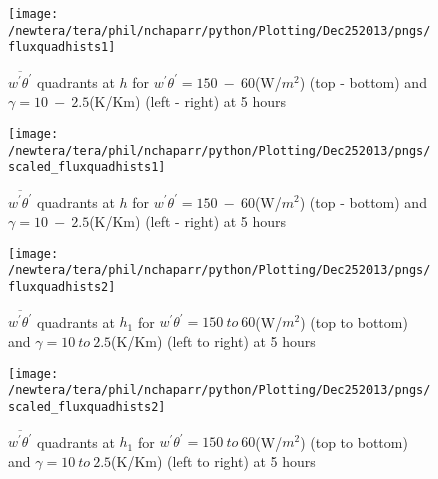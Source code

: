 \begin{figure}[htbp]
%
\centering
 \texttt{[image: /newtera/tera/phil/nchaparr/python/Plotting/Dec252013/pngs/fluxquadhists1]}                 

\caption{ $\overline{w^{'}\theta^{'}}$ quadrants at $h$ for $w^{'}\theta^{'} = 150 \ - \ 60$(W/$m^{2}$) (top - bottom) and $\gamma = 10 \ - \  2.5$(K/Km) (left - right) at 5 hours}

\label{fig:fluxquadsh}

\end{figure}

\begin{figure}[htbp]
%
\centering
 \texttt{[image: /newtera/tera/phil/nchaparr/python/Plotting/Dec252013/pngs/scaled\_fluxquadhists1]}                 

\caption{ $\overline{w^{'}\theta^{'}}$ quadrants at $h$ for $w^{'}\theta^{'} = 150 \ - \ 60$(W/$m^{2}$) (top - bottom) and $\gamma = 10 \ - \  2.5$(K/Km) (left - right) at 5 hours}

\label{fig:fluxquadsh}

\end{figure}


\begin{figure}[htbp]
\caption{ $\overline{w^{'}\theta^{'}}$ quadrants at $h_{1}$ for $w^{'}\theta^{'} = 150 \ to \ 60$(W/$m^{2}$) (top to bottom) and $\gamma = 10 \ to \ 2.5$(K/Km) (left to right) at 5 hours}
\centering
 \texttt{[image: /newtera/tera/phil/nchaparr/python/Plotting/Dec252013/pngs/fluxquadhists2]}                 
\label{fig:fluxquadsh1}
\end{figure}

\begin{figure}[htbp]
\caption{ $\overline{w^{'}\theta^{'}}$ quadrants at $h_{1}$ for $w^{'}\theta^{'} = 150 \ to \ 60$(W/$m^{2}$) (top to bottom) and $\gamma = 10 \ to \ 2.5$(K/Km) (left to right) at 5 hours}
\centering
 \texttt{[image: /newtera/tera/phil/nchaparr/python/Plotting/Dec252013/pngs/scaled\_fluxquadhists2]}                 
\label{fig:fluxquadsh1}
\end{figure}

